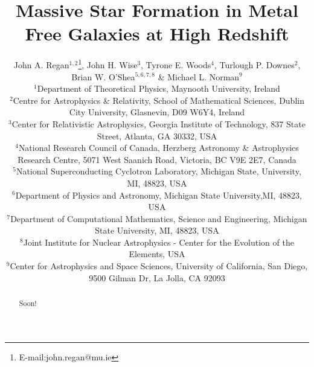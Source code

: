 \documentclass[graphics, twocolumn, usenatbib]{mn2e}
\begin{document}
\title{Massive Star Formation in Metal Free Galaxies at High Redshift}
\author[J. A. Regan, J. H. Wise,  T. E. Woods, T.P. Downes, B.W. O'Shea \&  M.L. Norman]{John A. Regan$^{1,2}$\thanks{E-mail:john.regan@mu.ie},
  John H. Wise$^{3}$, Tyrone E. Woods$^{4}$, Turlough P. Downes$^{2}$, \newauthor Brian W. O'Shea$^{5,6,7,8}$ \& Michael L. Norman$^9$\\
  $^1$Department of Theoretical Physics, Maynooth University, Ireland\\
  $^2$Centre for Astrophysics \& Relativity, School of Mathematical Sciences, Dublin City University, Glasnevin, D09 W6Y4, Ireland\\
  $^3$Center for Relativistic Astrophysics, Georgia Institute of Technology, 837 State Street, Atlanta, GA 30332, USA\\
  $^4$National Research Council of Canada, Herzberg Astronomy \& Astrophysics Research Centre, 5071 West Saanich Road, Victoria, BC V9E 2E7, Canada\\
  $^5$National Superconducting Cyclotron Laboratory, Michigan State, University, MI, 48823, USA\\
  $^6$Department of Physics and Astronomy, Michigan State University,MI, 48823, USA\\
  $^7$Department of Computational Mathematics, Science and Engineering, Michigan State University, MI, 48823, USA\\    
  $^8$Joint Institute for Nuclear Astrophysics - Center for the Evolution of the Elements, USA\\
  $^9$Center for Astrophysics and Space Sciences, University of California, San Diego, 9500 Gilman Dr, La Jolla, CA 92093\\}

\label{firstpage}
\pagerange{\pageref{firstpage}--\pageref{lastpage}}
\maketitle

\begin{abstract}
Soon!
\end{abstract}
\end{document}

